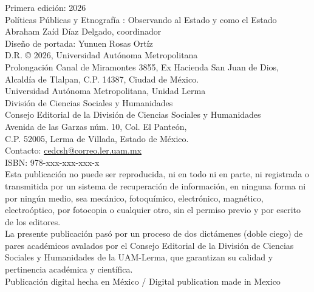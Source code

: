 \documentclass[
  spanish,
  11pt,
  a4paper,
]{scrbook}
\renewcommand*\contentsname{Tabla de contenidos}
\newcommand\contentsname{Tabla de contenidos}
\begin{document}
\begingroup
\begin{singlespace}
\scriptsize
\noindent
Primera edición: 2026\\
Políticas Públicas y Etnografía : Observando al Estado y como el Estado\\
Abraham Zaíd Díaz Delgado, coordinador\\[0.5em]
Diseño de portada: Yunuen Rosas Ortíz\\[0.5em]
D.R. © 2026, Universidad Autónoma Metropolitana\\
Prolongación Canal de Miramontes 3855, Ex Hacienda San Juan de Dios,\\
Alcaldía de Tlalpan, C.P. 14387, Ciudad de México.\\[0.5em]
{\scriptsize Universidad Autónoma Metropolitana, Unidad Lerma}\\
División de Ciencias Sociales y Humanidades\\
Consejo Editorial de la División de Ciencias Sociales y Humanidades\\
Avenida de las Garzas núm. 10, Col. El Panteón,\\
C.P. 52005, Lerma de Villada, Estado de México.\\
Contacto: \href{mailto:cedcsh@correo.ler.uam.mx}{cedcsh@correo.ler.uam.mx}\\[0.8em]
ISBN: 978-xxx-xxx-xxx-x\\[0.8em]
Esta publicación no puede ser reproducida, ni en todo ni en parte, ni registrada o transmitida por un sistema de recuperación de información, en ninguna forma ni por ningún medio, sea mecánico, fotoquímico, electrónico, magnético, electroóptico, por fotocopia o cualquier otro, sin el permiso previo y por escrito de los editores.\\[0.5em]
La presente publicación pasó por un proceso de dos dictámenes (doble ciego) de pares académicos avalados por el Consejo Editorial de la División de Ciencias Sociales y Humanidades de la UAM-Lerma, que garantizan su calidad y pertinencia académica y científica.\\[0.5em]
Publicación digital hecha en México / Digital publication made in Mexico
\end{singlespace}
\endgroup
\clearpage

\clearpage
\thispagestyle{empty}
\null
\clearpage

\renewcommand*\contentsname{Índice}
{
\setcounter{tocdepth}{1}
\tableofcontents
}
\end{document}
